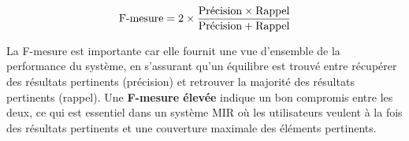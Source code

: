 \begin{section}
 \[
   \text{F-mesure} = 2 \times \frac{\text{Précision}\times\text{Rappel}}{\text{Précision}+\text{Rappel}}
   \vspace{1cm}
 \]

 La F-mesure est importante car elle fournit une vue d'ensemble de la
 performance du système, en s'assurant qu'un équilibre est trouvé entre
 récupérer des résultats pertinents (précision) et retrouver la majorité des
 résultats pertinents (rappel). Une \textbf{F-mesure élevée} indique un bon compromis
 entre les deux, ce qui est essentiel dans un système MIR où les utilisateurs
 veulent à la fois des résultats pertinents et une couverture maximale des
 éléments pertinents.

 \vfill
\end{section} 